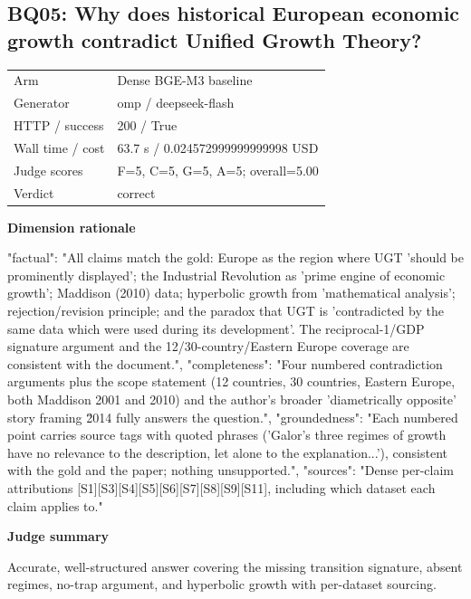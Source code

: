 \documentclass[10pt]{article}
\begin{document}
\subsection{BQ05: Why does historical European economic growth contradict Unified Growth Theory?}
\begin{tabular}{@{}ll@{}}
Arm & Dense BGE-M3 baseline\\
Generator & omp / deepseek-flash\\
HTTP / success & 200 / True\\
Wall time / cost & 63.7 s / 0.024572999999999998 USD\\
Judge scores & F=5, C=5, G=5, A=5; overall=5.00\\
Verdict & correct\\
\end{tabular}

\textbf{Dimension rationale}
\begin{EvidenceText}
{
  "factual": "All claims match the gold: Europe as the region where UGT 'should be prominently displayed'; the Industrial Revolution as 'prime engine of economic growth'; Maddison (2010) data; hyperbolic growth from 'mathematical analysis'; rejection/revision principle; and the paradox that UGT is 'contradicted by the same data which were used during its development'. The reciprocal-1/GDP signature argument and the 12/30-country/Eastern Europe coverage are consistent with the document.",
  "completeness": "Four numbered contradiction arguments plus the scope statement (12 countries, 30 countries, Eastern Europe, both Maddison 2001 and 2010) and the author's broader 'diametrically opposite' story framing \u2014 fully answers the question.",
  "groundedness": "Each numbered point carries source tags with quoted phrases ('Galor's three regimes of growth have no relevance to the description, let alone to the explanation...'), consistent with the gold and the paper; nothing unsupported.",
  "sources": "Dense per-claim attributions [S1][S3][S4][S5][S6][S7][S8][S9][S11], including which dataset each claim applies to."
}
\end{EvidenceText}

\textbf{Judge summary}
\begin{EvidenceText}
Accurate, well-structured answer covering the missing transition signature, absent regimes, no-trap argument, and hyperbolic growth with per-dataset sourcing.
\end{EvidenceText}
\end{document}
